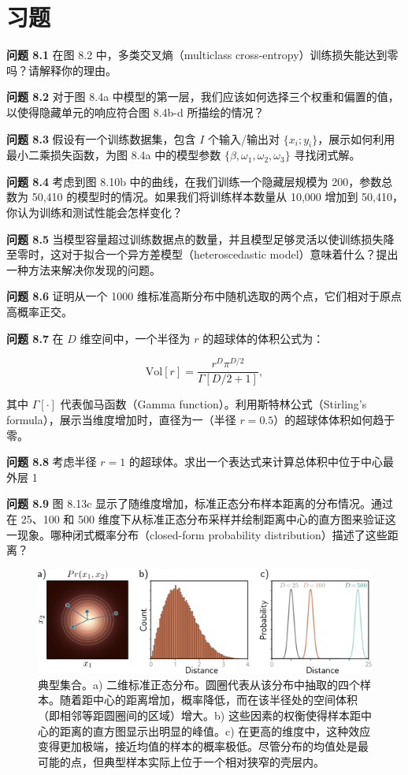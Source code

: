 \section{习题}
\textbf{问题 8.1} 在图 8.2 中，多类交叉熵（multiclass cross-entropy）训练损失能达到零吗？请解释你的理由。

\textbf{问题 8.2} 对于图 8.4a 中模型的第一层，我们应该如何选择三个权重和偏置的值，以使得隐藏单元的响应符合图 8.4b-d 所描绘的情况？

\textbf{问题 8.3} 假设有一个训练数据集，包含 \( I \) 个输入/输出对 \( \{x_i; y_i\} \)，展示如何利用最小二乘损失函数，为图 8.4a 中的模型参数 \( \{\beta, \omega_1, \omega_2, \omega_3\} \) 寻找闭式解。

\textbf{问题 8.4} 考虑到图 8.10b 中的曲线，在我们训练一个隐藏层规模为 200，参数总数为 50,410 的模型时的情况。如果我们将训练样本数量从 10,000 增加到 50,410，你认为训练和测试性能会怎样变化？

\textbf{问题 8.5} 当模型容量超过训练数据点的数量，并且模型足够灵活以使训练损失降至零时，这对于拟合一个异方差模型（heteroscedastic model）意味着什么？提出一种方法来解决你发现的问题。

\textbf{问题 8.6} 证明从一个 1000 维标准高斯分布中随机选取的两个点，它们相对于原点高概率正交。

\textbf{问题 8.7} 在 \( D \) 维空间中，一个半径为 \( r \) 的超球体的体积公式为：

\begin{equation}
\text{Vol}[r] = \frac{r^D \pi^{D/2}}{\Gamma[D/2 + 1]}, 
\end{equation}

其中 \( \Gamma[\cdot] \) 代表伽马函数（Gamma function）。利用斯特林公式（Stirling's formula），展示当维度增加时，直径为一（半径 \( r=0.5 \)）的超球体体积如何趋于零。

\textbf{问题 8.8} 考虑半径 \( r = 1 \) 的超球体。求出一个表达式来计算总体积中位于中心最外层 1%

\textbf{问题 8.9} 图 8.13c 显示了随维度增加，标准正态分布样本距离的分布情况。通过在 25、100 和 500 维度下从标准正态分布采样并绘制距离中心的直方图来验证这一现象。哪种闭式概率分布（closed-form probability distribution）描述了这些距离？

\begin{figure}[ht!]
\centering
\includegraphics[width=0.7\linewidth]{png/chapter8/PerfTypical.png}
\caption{典型集合。a) 二维标准正态分布。圆圈代表从该分布中抽取的四个样本。随着距中心的距离增加，概率降低，而在该半径处的空间体积（即相邻等距圆圈间的区域）增大。b) 这些因素的权衡使得样本距中心的距离的直方图显示出明显的峰值。c) 在更高的维度中，这种效应变得更加极端，接近均值的样本的概率极低。尽管分布的均值处是最可能的点，但典型样本实际上位于一个相对狭窄的壳层内。}
\end{figure}

